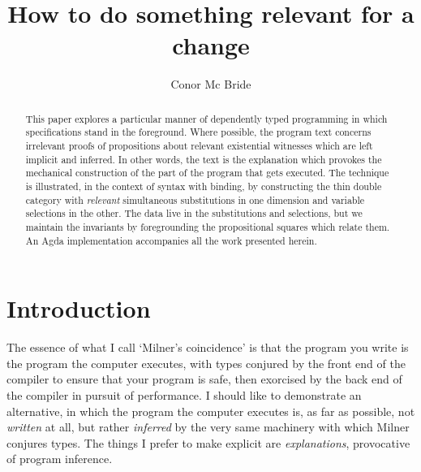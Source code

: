 \documentclass[orivec]{jfp}
\begin{document}


\totalpg{\pageref{lastpage01}}

\title{How to do something relevant for a change}

\begin{authgrp}
\author{Conor Mc Bride}
\end{authgrp}


\begin{abstract}
  This paper explores a particular manner of dependently typed programming in which specifications stand in the foreground. Where possible, the program text concerns irrelevant proofs of propositions about relevant existential witnesses which are left implicit and inferred. In other words, the text is the explanation which provokes the mechanical construction of the part of the program that gets executed. The technique is illustrated, in the context of syntax with binding, by constructing the thin double category with \emph{relevant} simultaneous substitutions in one dimension and variable selections in the other. The data live in the substitutions and selections, but we maintain the invariants by foregrounding the propositional squares which relate them. An Agda implementation accompanies all the work presented herein.
\end{abstract}

\maketitle%

\section{Introduction}

The essence of what I call `Milner's coincidence' is that the program
you write is the program the computer executes, with types conjured by
the front end of the compiler to ensure that your program is safe,
then exorcised by the back end of the compiler in pursuit of
performance. I should like to demonstrate an alternative, in
which the program the computer executes is, as far as possible, not
\emph{written} at all, but rather \emph{inferred} by the very same
machinery with which Milner conjures types. The things I prefer to
make explicit are \emph{explanations}, provocative of program
inference.
\end{document}
